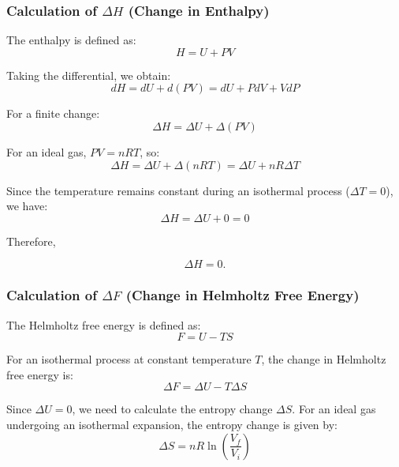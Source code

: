 \documentclass[10pt,twocoloumn]{article}
\begin{document}
\subsubsection*{Calculation of $\Delta H$ (Change in Enthalpy)}

The enthalpy is defined as:
\begin{equation}H = U + PV\end{equation}

Taking the differential, we obtain:
\begin{equation}dH = dU + d(PV) = dU + PdV + VdP\end{equation}

For a finite change:
\begin{equation}\Delta H = \Delta U + \Delta(PV)\end{equation}

For an ideal gas, $PV = nRT$, so:
\begin{equation}\Delta H = \Delta U + \Delta(nRT) = \Delta U + nR\Delta T\end{equation}

Since the temperature remains constant during an isothermal process ($\Delta T = 0$), we have:
\begin{equation}\Delta H = \Delta U + 0 = 0\end{equation}

Therefore,

\begin{equation}\boxed{\Delta H = 0}.\end{equation}

\subsubsection*{Calculation of $\Delta F$ (Change in Helmholtz Free Energy)}

The Helmholtz free energy is defined as:
\begin{equation}F = U - TS\end{equation}

For an isothermal process at constant temperature $T$, the change in Helmholtz free energy is:
\begin{equation}\Delta F = \Delta U - T\Delta S\end{equation}

Since $\Delta U = 0$, we need to calculate the entropy change $\Delta S$. For an ideal gas undergoing an isothermal expansion, the entropy change is given by:
\begin{equation}\Delta S = nR\ln\left(\frac{V_f}{V_i}\right)\end{equation}
\end{document}

